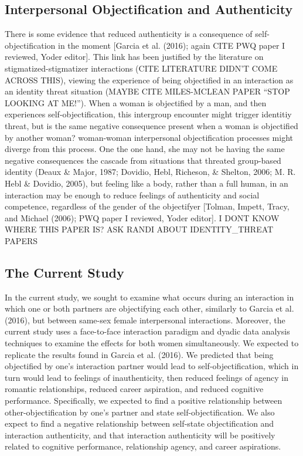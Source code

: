 \documentclass[man]{apa6}
\begin{document}
\subsection{Interpersonal Objectification and
Authenticity}\label{interpersonal-objectification-and-authenticity}

There is some evidence that reduced authenticity is a consequence of
self-objectification in the moment {[}Garcia et al. (2016); again CITE
PWQ paper I reviewed, Yoder editor{]}. This link has been justified by
the literature on stigmatized-stigmatizer interactions (CITE LITERATURE
DIDN'T COME ACROSS THIS), viewing the experience of being objectified in
an interaction as an identity threat situation (MAYBE CITE MILES-MCLEAN
PAPER \enquote{STOP LOOKING AT ME!}). When a woman is objectified by a
man, and then experiences self-objectification, this intergroup
encounter might trigger identitiy threat, but is the same negative
consequence present when a woman is objectified by another woman?
woman-woman interpersonal objectification processes might diverge from
this process. One the one hand, she may not be having the same negative
consequences the cascade from situations that threated group-based
identity (Deaux \& Major, 1987; Dovidio, Hebl, Richeson, \& Shelton,
2006; M. R. Hebl \& Dovidio, 2005), but feeling like a body, rather than
a full human, in an interaction may be enough to reduce feelings of
authenticity and social competence, regardless of the gender of the
objectifyer {[}Tolman, Impett, Tracy, and Michael (2006); PWQ paper I
reviewed, Yoder editor{]}. I DONT KNOW WHERE THIS PAPER IS? ASK RANDI
ABOUT IDENTITY\_THREAT PAPERS

\subsection{The Current Study}\label{the-current-study}

In the current study, we sought to examine what occurs during an
interaction in which one or both partners are objectifying each other,
similarly to Garcia et al. (2016), but between same-sex female
interpersonal interactions. Moreover, the current study uses a
face-to-face interaction paradigm and dyadic data analysis techniques to
examine the effects for both women simultaneously. We expected to
replicate the results found in Garcia et al. (2016). We predicted that
being objectified by one's interaction partner would lead to
self-objectification, which in turn would lead to feelings of
inauthenticity, then reduced feelings of agency in romantic
relationships, reduced career aspiration, and reduced cognitive
performance. Specifically, we expected to find a positive relationship
between other-objectification by one's partner and state
self-objectification. We also expect to find a negative relationship
between self-state objectification and interaction authenticity, and
that interaction authenticity will be positively related to cognitive
performance, relationship agency, and career aspirations.
\end{document}
